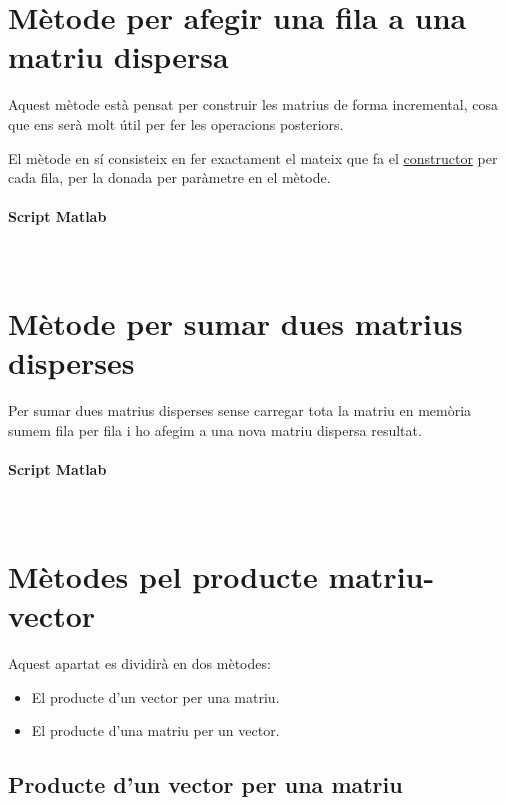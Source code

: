 \documentclass[11pt,a4paper,twoside]{report}
\begin{document}
\section{Mètode per afegir una fila a una matriu dispersa}

Aquest mètode està pensat per construir les matrius de forma incremental, cosa que ens serà molt útil per fer les operacions posteriors.

El mètode en sí consisteix en fer exactament el mateix que fa el \hyperref[sec:Constructor]{constructor} per cada fila, per la donada per paràmetre en el mètode. 

\paragraph*{Script Matlab} \mbox{} \\



\section{Mètode per sumar dues matrius disperses}

Per sumar dues matrius disperses sense carregar tota la matriu en memòria sumem fila per fila i ho afegim a una nova matriu dispersa resultat.

\paragraph*{Script Matlab} \mbox{} \\


\section{Mètodes pel producte matriu-vector}

Aquest apartat es dividirà en dos mètodes: 
\begin{itemize}
\item El producte d'un vector per una matriu.
\item El producte d'una matriu per un vector.
\end{itemize}

\subsection{Producte d'un vector per una matriu}
\end{document}
